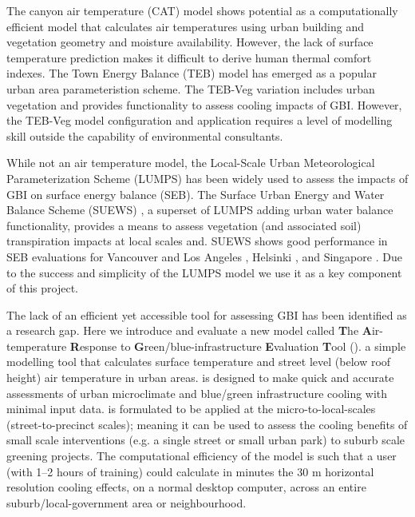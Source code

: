 \documentclass[final,3p,times,authoryear]{elsarticle}
\begin{document}
The canyon air temperature (CAT) model \citep{Erell2006} shows potential as a computationally efficient model that calculates air temperatures using urban building and vegetation geometry and moisture availability. However, the lack of surface temperature prediction makes it difficult to derive human thermal comfort indexes. The Town Energy Balance (TEB) model \citep{Masson2000} has emerged as a popular urban area parameteristion scheme. The TEB-Veg \citep{Lemonsu2012,redon2017} variation includes  urban vegetation and provides functionality to assess cooling impacts of GBI. However, the TEB-Veg model configuration and application requires a  level of modelling skill outside the capability of environmental  consultants. 

While not an air temperature model, the Local-Scale Urban Meteorological Parameterization Scheme (LUMPS) \citep{Grimmond2002a} has been widely used  to assess the impacts of GBI on surface energy balance (SEB). The Surface Urban Energy and Water Balance Scheme (SUEWS) \citep{Jarvi2011}, a superset of LUMPS adding urban water balance functionality, provides a means to assess vegetation (and associated soil) transpiration impacts at local scales and. SUEWS shows good performance in SEB evaluations for Vancouver and Los Angeles \citep{Jarvi2011}, Helsinki \citep{Jarvi2014a}, and Singapore \citep{demuzere2017impact}. Due to the success and simplicity of the LUMPS model we use it as a key component of this project.  

The lack of an efficient yet accessible tool for assessing GBI has been identified as a research gap. Here we introduce and evaluate a new model called \textbf{T}he \textbf{A}ir-temperature \textbf{R}esponse to \textbf{G}reen/blue-infrastructure \textbf{E}valuation \textbf{T}ool ().  a simple modelling tool that calculates surface temperature and street level (below roof height) air temperature in urban areas.  is designed to make quick and accurate assessments of urban microclimate and blue/green infrastructure cooling with minimal input data.  is formulated to be applied at the micro-to-local-scales (street-to-precinct scales); meaning it can be used to assess the cooling benefits of small scale interventions (e.g. a single street or small urban park) to suburb scale greening projects. The computational efficiency of the model is such that a user (with 1--2 hours of training) could calculate in minutes the 30 m horizontal resolution  cooling effects, on a normal desktop computer, across an entire suburb/local-government area or neighbourhood. 
\end{document}
